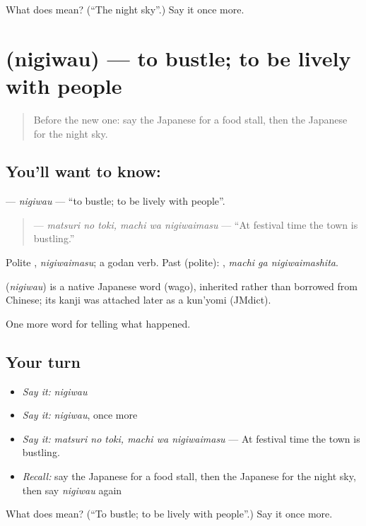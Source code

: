 \begin{tcolorbox}[breakable,colback=teal!4,colframe=teal!35!black,title={Before you move on}]
What does  mean? (\textquotedblleft{}The night sky\textquotedblright{}.) Say it once more.
\end{tcolorbox}
\section[\texorpdfstring{\ja{にぎわう} (nigiwau)}{にぎわう (nigiwau)}]{ (nigiwau) — to bustle; to be lively with people}

\label{lesson:JA-C293-nigiwau}



\begin{quote}
Before the new one: say the Japanese for a food stall, then the Japanese for the night sky.
\end{quote}

\subsection*{You'll want to know: }
\textbf{} — \emph{nigiwau} — \textquotedblleft{}to bustle; to be lively with people\textquotedblright{}.

\begin{quote}
\textbf{  } — \emph{matsuri no toki, machi wa nigiwaimasu} — \textquotedblleft{}At festival time the town is bustling.\textquotedblright{}
\end{quote}

Polite \textbf{}, \emph{nigiwaimasu}; a godan verb. Past (polite): \textbf{ }, \emph{machi ga nigiwaimashita}.

\begin{cousinweb}
\textbf{} (\emph{nigiwau}) is a native Japanese word (wago), inherited rather than borrowed from Chinese; its kanji was attached later as a kun'yomi (JMdict).
\end{cousinweb}

\begin{grammarlens}[title={What you've built}]
One more word for telling what happened.
\end{grammarlens}

\subsection*{Your turn}
\begin{itemize}
\raggedright
  \item \emph{Say it:} \emph{nigiwau}
  \item \emph{Say it:} \emph{nigiwau}, once more
  \item \emph{Say it:} \emph{matsuri no toki, machi wa nigiwaimasu} — At festival time the town is bustling.
  \item \emph{Recall:} say the Japanese for a food stall, then the Japanese for the night sky, then say \emph{nigiwau} again
\end{itemize}

\begin{tcolorbox}[breakable,colback=teal!4,colframe=teal!35!black,title={Before you move on}]
What does  mean? (\textquotedblleft{}To bustle; to be lively with people\textquotedblright{}.) Say it once more.
\end{tcolorbox}

